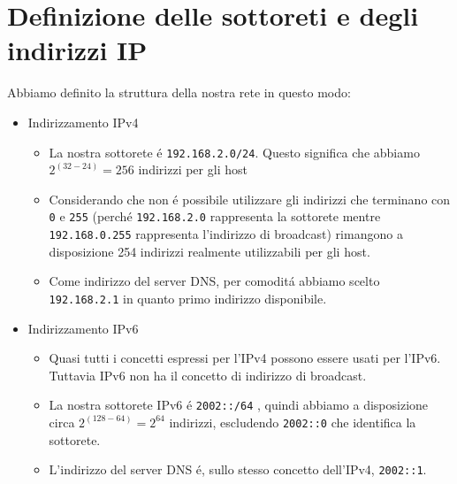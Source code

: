 \documentclass[9pt, a4paper, oneside]{article}
\begin{document}
		\section{Definizione delle sottoreti e degli indirizzi IP}
			\par
				Abbiamo definito la struttura della nostra rete 
				in questo modo:
				\begin{itemize}
					\item
						Indirizzamento IPv4
						\begin{itemize}
							\item
								La nostra 
								sottorete \'e 
								\texttt{192.168.2.0/24}.
								Questo 
								significa che 
								abbiamo 
								$2^{(32-24)}
								= 256 $
								indirizzi per 
								gli 
								host
							\item
								Considerando 
								che non \'e 
								possibile 
								utilizzare gli 
								indirizzi che 
								terminano con 
								\texttt{0}
								e \texttt{255} 
								(perch\'e 
								\texttt{192.168.2.0}
								rappresenta la 
								sottorete 
								mentre 
								\texttt{192.168.0.255}
								rappresenta 
								l'indirizzo di 
								broadcast) 
								rimangono a 
								disposizione 
								254 indirizzi 
								realmente 
								utilizzabili 
								per gli host.
							\item
								Come indirizzo 
								del server DNS, 
								per comodit\'a 
								abbiamo scelto 
								\texttt{192.168.2.1}
								in quanto primo 
								indirizzo 
								disponibile.
						\end{itemize}
					\item
						Indirizzamento IPv6
						\begin{itemize}
							\item
								Quasi tutti i 
								concetti
								espressi per 
								l'IPv4 possono 
								essere usati 
								per l'IPv6.
								Tuttavia IPv6 
								non ha il 
								concetto di 
								indirizzo di
								broadcast.
							\item
								La nostra 
								sottorete IPv6 
								\'e 
								\texttt{2002::/64}
								, quindi 
								abbiamo a 
								disposizione circa 
								$2^{(128-64)} 
								= 2^{64}$
								indirizzi, 
								escludendo 
								\texttt{2002::0}
								che identifica 
								la sottorete.
							\item
								L'indirizzo del 
								server DNS \'e, 
								sullo stesso 
								concetto 
								dell'IPv4,
								\texttt{2002::1}.
						\end{itemize}
				\end{itemize}
\end{document}
